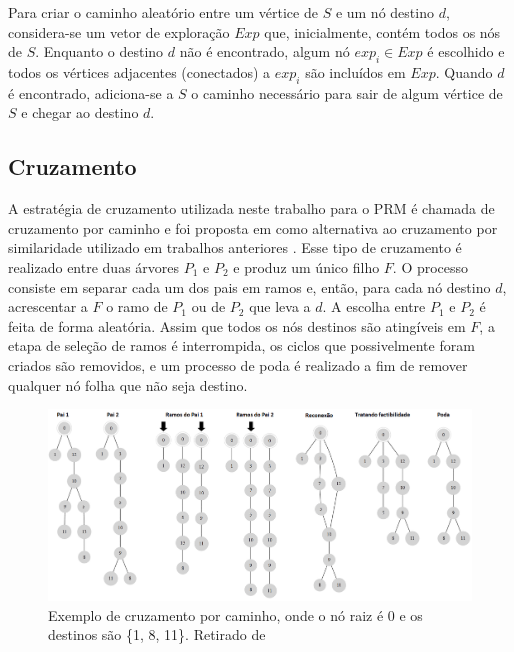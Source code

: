 Para criar o caminho aleatório entre um vértice de $S$ e um nó destino $d$, considera-se um vetor de exploração $Exp$ que, inicialmente, contém todos os nós de $S$. Enquanto o destino $d$ não é encontrado, algum nó $exp_i \in Exp$ é escolhido e todos os vértices adjacentes (conectados) a $exp_i$ são incluídos em $Exp$. Quando $d$ é encontrado, adiciona-se a $S$ o caminho necessário para sair de algum vértice de $S$ e chegar ao destino $d$.

\subsection{Cruzamento}

A estratégia de cruzamento utilizada neste trabalho para o PRM é chamada de cruzamento por caminho e foi proposta em \cite{Lafeta2016} como alternativa ao cruzamento por similaridade utilizado em trabalhos anteriores \cite{Bueno2010}. Esse tipo de cruzamento é realizado entre duas árvores $P_1$ e $P_2$ e produz um único filho $F$. O processo consiste em separar cada um dos pais em ramos e, então, para cada nó destino $d$, acrescentar a $F$ o ramo de $P_1$ ou de $P_2$ que leva a $d$. A escolha entre $P_1$ e $P_2$ é feita de forma aleatória. Assim que todos os nós destinos são atingíveis em $F$, a etapa de seleção de ramos é interrompida, os ciclos que possivelmente foram criados são removidos, e um processo de poda é realizado a fim de remover qualquer nó folha que não seja destino.

\begin{figure}[!htbp]
	\centering
	\includegraphics[width=1\textwidth]{cap_problemas/figs/prm-cruzamento-caminho}
	\caption{\label{fig_prm-cruzamento-caminho}Exemplo de cruzamento por caminho, onde o nó raiz é 0 e os destinos são \{1, 8, 11\}. Retirado de \cite{LafetaThesis}}
\end{figure}

